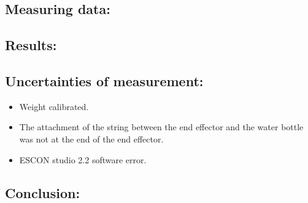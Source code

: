 \subsection*{Measuring data:}




\subsection*{Results:}

\subsection*{Uncertainties of measurement:}
\begin{itemize}
\item Weight calibrated.
\item The attachment of the string between the end effector and the water bottle was not at the end of the end effector.
\item ESCON studio 2.2 software error.
\end{itemize}

\subsection*{Conclusion:}

